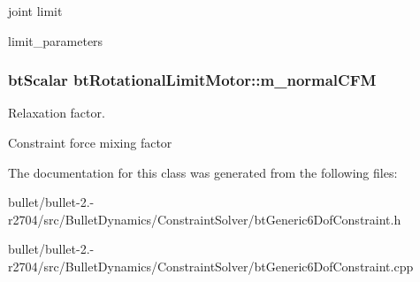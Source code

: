joint limit 

limit\+\_\+parameters \hypertarget{classbt_rotational_limit_motor_a3d06f5a5de013fd97f39cf63273dce45}{
\subsubsection[{m\+\_\+normal\+C\+F\+M}]{\setlength{\rightskip}{0pt plus 5cm}bt\+Scalar bt\+Rotational\+Limit\+Motor\+::m\+\_\+normal\+C\+F\+M}}\label{classbt_rotational_limit_motor_a3d06f5a5de013fd97f39cf63273dce45}


Relaxation factor. 

Constraint force mixing factor 

The documentation for this class was generated from the following files\+:\begin{DoxyCompactItemize}
\item 
bullet/bullet-\/2.-\/r2704/src/\+Bullet\+Dynamics/\+Constraint\+Solver/bt\+Generic6\+Dof\+Constraint.\+h\item 
bullet/bullet-\/2.-\/r2704/src/\+Bullet\+Dynamics/\+Constraint\+Solver/bt\+Generic6\+Dof\+Constraint.\+cpp\end{DoxyCompactItemize}
